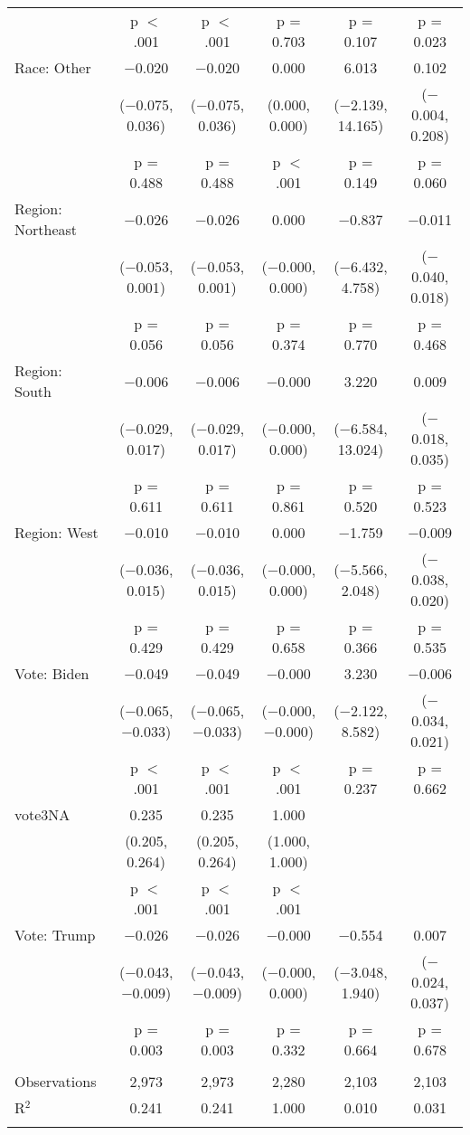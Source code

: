 \begin{tabular}{@{\extracolsep{5pt}}lccccc}
  & p $<$ .001 & p $<$ .001 & p = 0.703 & p = 0.107 & p = 0.023 \\ 
  Race: Other & $-$0.020 & $-$0.020 & 0.000 & 6.013 & 0.102 \\ 
  & ($-$0.075, 0.036) & ($-$0.075, 0.036) & (0.000, 0.000) & ($-$2.139, 14.165) & ($-$0.004, 0.208) \\ 
  & p = 0.488 & p = 0.488 & p $<$ .001 & p = 0.149 & p = 0.060 \\ 
  Region: Northeast & $-$0.026 & $-$0.026 & 0.000 & $-$0.837 & $-$0.011 \\ 
  & ($-$0.053, 0.001) & ($-$0.053, 0.001) & ($-$0.000, 0.000) & ($-$6.432, 4.758) & ($-$0.040, 0.018) \\ 
  & p = 0.056 & p = 0.056 & p = 0.374 & p = 0.770 & p = 0.468 \\ 
  Region: South & $-$0.006 & $-$0.006 & $-$0.000 & 3.220 & 0.009 \\ 
  & ($-$0.029, 0.017) & ($-$0.029, 0.017) & ($-$0.000, 0.000) & ($-$6.584, 13.024) & ($-$0.018, 0.035) \\ 
  & p = 0.611 & p = 0.611 & p = 0.861 & p = 0.520 & p = 0.523 \\ 
  Region: West & $-$0.010 & $-$0.010 & 0.000 & $-$1.759 & $-$0.009 \\ 
  & ($-$0.036, 0.015) & ($-$0.036, 0.015) & ($-$0.000, 0.000) & ($-$5.566, 2.048) & ($-$0.038, 0.020) \\ 
  & p = 0.429 & p = 0.429 & p = 0.658 & p = 0.366 & p = 0.535 \\ 
  Vote: Biden & $-$0.049 & $-$0.049 & $-$0.000 & 3.230 & $-$0.006 \\ 
  & ($-$0.065, $-$0.033) & ($-$0.065, $-$0.033) & ($-$0.000, $-$0.000) & ($-$2.122, 8.582) & ($-$0.034, 0.021) \\ 
  & p $<$ .001 & p $<$ .001 & p $<$ .001 & p = 0.237 & p = 0.662 \\ 
  vote3NA & 0.235 & 0.235 & 1.000 &  &  \\ 
  & (0.205, 0.264) & (0.205, 0.264) & (1.000, 1.000) &  &  \\ 
  & p $<$ .001 & p $<$ .001 & p $<$ .001 &  &  \\ 
  Vote: Trump & $-$0.026 & $-$0.026 & $-$0.000 & $-$0.554 & 0.007 \\ 
  & ($-$0.043, $-$0.009) & ($-$0.043, $-$0.009) & ($-$0.000, 0.000) & ($-$3.048, 1.940) & ($-$0.024, 0.037) \\ 
  & p = 0.003 & p = 0.003 & p = 0.332 & p = 0.664 & p = 0.678 \\ 
 \hline \\[-1.8ex] 

Observations & 2,973 & 2,973 & 2,280 & 2,103 & 2,103 \\ 
R$^{2}$ & 0.241 & 0.241 & 1.000 & 0.010 & 0.031 \\ 
\hline 
\hline \\[-1.8ex] 
\end{tabular} 